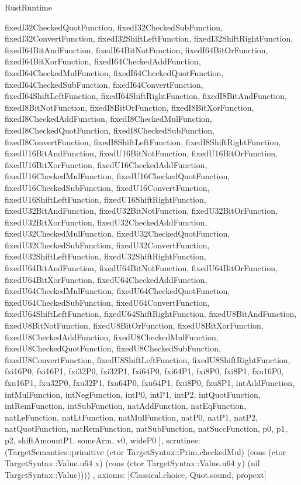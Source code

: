 \begin{lexlean}{RustRuntime}
\begin{semanticmodule}
{{      fixedI32CheckedQuotFunction,
      fixedI32CheckedSubFunction,
      fixedI32ConvertFunction,
      fixedI32ShiftLeftFunction,
      fixedI32ShiftRightFunction,
      fixedI64BitAndFunction,
      fixedI64BitNotFunction,
      fixedI64BitOrFunction,
      fixedI64BitXorFunction,
      fixedI64CheckedAddFunction,
      fixedI64CheckedMulFunction,
      fixedI64CheckedQuotFunction,
      fixedI64CheckedSubFunction,
      fixedI64ConvertFunction,
      fixedI64ShiftLeftFunction,
      fixedI64ShiftRightFunction,
      fixedI8BitAndFunction,
      fixedI8BitNotFunction,
      fixedI8BitOrFunction,
      fixedI8BitXorFunction,
      fixedI8CheckedAddFunction,
      fixedI8CheckedMulFunction,
      fixedI8CheckedQuotFunction,
      fixedI8CheckedSubFunction,
      fixedI8ConvertFunction,
      fixedI8ShiftLeftFunction,
      fixedI8ShiftRightFunction,
      fixedU16BitAndFunction,
      fixedU16BitNotFunction,
      fixedU16BitOrFunction,
      fixedU16BitXorFunction,
      fixedU16CheckedAddFunction,
      fixedU16CheckedMulFunction,
      fixedU16CheckedQuotFunction,
      fixedU16CheckedSubFunction,
      fixedU16ConvertFunction,
      fixedU16ShiftLeftFunction,
      fixedU16ShiftRightFunction,
      fixedU32BitAndFunction,
      fixedU32BitNotFunction,
      fixedU32BitOrFunction,
      fixedU32BitXorFunction,
      fixedU32CheckedAddFunction,
      fixedU32CheckedMulFunction,
      fixedU32CheckedQuotFunction,
      fixedU32CheckedSubFunction,
      fixedU32ConvertFunction,
      fixedU32ShiftLeftFunction,
      fixedU32ShiftRightFunction,
      fixedU64BitAndFunction,
      fixedU64BitNotFunction,
      fixedU64BitOrFunction,
      fixedU64BitXorFunction,
      fixedU64CheckedAddFunction,
      fixedU64CheckedMulFunction,
      fixedU64CheckedQuotFunction,
      fixedU64CheckedSubFunction,
      fixedU64ConvertFunction,
      fixedU64ShiftLeftFunction,
      fixedU64ShiftRightFunction,
      fixedU8BitAndFunction,
      fixedU8BitNotFunction,
      fixedU8BitOrFunction,
      fixedU8BitXorFunction,
      fixedU8CheckedAddFunction,
      fixedU8CheckedMulFunction,
      fixedU8CheckedQuotFunction,
      fixedU8CheckedSubFunction,
      fixedU8ConvertFunction,
      fixedU8ShiftLeftFunction,
      fixedU8ShiftRightFunction,
      fxi16P0,
      fxi16P1,
      fxi32P0,
      fxi32P1,
      fxi64P0,
      fxi64P1,
      fxi8P0,
      fxi8P1,
      fxu16P0,
      fxu16P1,
      fxu32P0,
      fxu32P1,
      fxu64P0,
      fxu64P1,
      fxu8P0,
      fxu8P1,
      intAddFunction,
      intMulFunction,
      intNegFunction,
      intP0,
      intP1,
      intP2,
      intQuotFunction,
      intRemFunction,
      intSubFunction,
      natAddFunction,
      natEqFunction,
      natLeFunction,
      natLtFunction,
      natMulFunction,
      natP0,
      natP1,
      natP2,
      natQuotFunction,
      natRemFunction,
      natSubFunction,
      natSuccFunction,
      p0,
      p1,
      p2,
      shiftAmountP1,
      someArm,
      v0,
      wideP0
    ],
    scrutinee: (TargetSemantics::primitive (ctor TargetSyntax::Prim.checkedMul) (cons (ctor TargetSyntax::Value.u64 x) (cons (ctor TargetSyntax::Value.u64 y) (nil TargetSyntax::Value))))
  },
  axioms: [Classical.choice, Quot.sound, propext]
}


\end{semanticmodule}
\end{lexlean}
